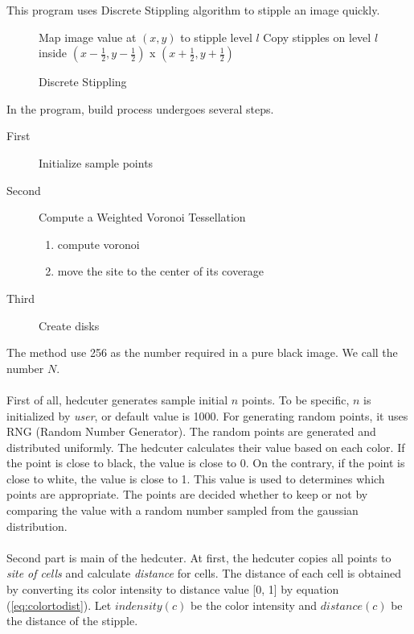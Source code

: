 \documentclass[11pt]{article}
\begin{document}
This program uses Discrete Stippling algorithm\cite{weighted-voronoi-stippling} to stipple an image quickly.

\begin{figure}[hbt]
\centering
\begin{minipage}{0.7\textwidth}

\begin{algorithm}[H]
\caption{Discrete Stippling}
\label{discretestippling}
\begin{algorithmic}

	\State Map image value at $(x, y)$ to stipple level $l$
	\State Copy stipples on level $l$ inside $(x-\frac{1}{2}, y-\frac{1}{2})$ x $(x+\frac{1}{2}, y+\frac{1}{2})$
\EndFor
\end{algorithmic}
\end{algorithm}
\end{minipage}
\end{figure}

\clearpage
In the program, build process undergoes several steps. 
\begin{description}
  \item[First] Initialize sample points
  \item[Second] Compute a Weighted Voronoi Tessellation
	\begin{enumerate}
	  \item compute voronoi
	  \item move the site to the center of its coverage
	\end{enumerate}
  \item[Third] Create disks
\end{description}
The method use 256 as the number required in a pure black image. We call the number $N$.
\\ \\
First of all, hedcuter generates sample initial $n$ points. To be specific, $n$ is initialized by \textit{user}, or default value is 1000. For generating random points, it uses RNG (Random Number Generator). The random points are generated and distributed uniformly. The hedcuter calculates their value based on each color. If the point is close to black, the value is close to 0. On the contrary, if the point is close to white, the value is close to 1. This value is used to determines which points are appropriate. The points are decided whether to keep or not by comparing the value with a random number sampled from the gaussian distribution. 
\\ \\
Second part is main of the hedcuter. At first, the hedcuter copies all points to \textit{site of cells} and calculate \textit{distance} for cells. The distance of each cell is obtained by converting its color intensity to distance value [0, 1] by equation (\ref{eq:colortodist}). Let $indensity(c)$ be the color intensity and $distance(c)$ be the distance of the stipple.
\end{document}
